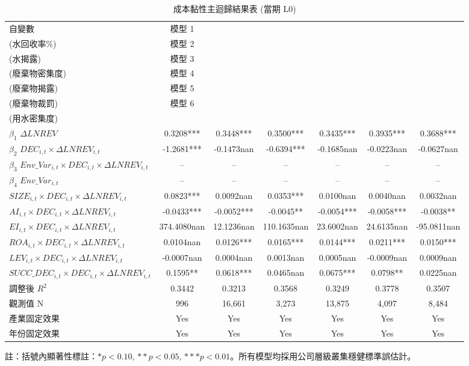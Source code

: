 \documentclass[12pt,a4paper]{article}
\begin{document}
\begin{table}[H]
\centering
\caption{成本黏性主迴歸結果表 (當期 L0)}
\label{tab:main_reg}
\begin{threeparttable}
\scriptsize
\begin{tabular}{lcccccc}
\toprule
自變數 & 模型 1\\(水回收率\%) & 模型 2\\(水揭露) & 模型 3\\(廢棄物密集度) & 模型 4\\(廢棄物揭露) & 模型 5\\(廢棄物裁罰) & 模型 6\\(用水密集度) \\
\midrule
$\beta_1$ $\Delta LNREV$ & 0.3208*** & 0.3448*** & 0.3500*** & 0.3435*** & 0.3935*** & 0.3688*** \\
$\beta_2$ $DEC_{i,t} \times \Delta LNREV_{i,t}$ & -1.2681*** & -0.1473nan & -0.6394*** & -0.1685nan & -0.0223nan & -0.0627nan \\
$\beta_3$ $Env\_Var_{i,t} \times DEC_{i,t} \times \Delta LNREV_{i,t}$ & -- & -- & -- & -- & -- & -- \\
$\beta_4$ $Env\_Var_{i,t}$ & -- & -- & -- & -- & -- & -- \\
 $SIZE_{i,t} \times DEC_{i,t} \times \Delta LNREV_{i,t}$ & 0.0823*** & 0.0092nan & 0.0353*** & 0.0100nan & 0.0040nan & 0.0032nan \\
 $AI_{i,t} \times DEC_{i,t} \times \Delta LNREV_{i,t}$ & -0.0433*** & -0.0052*** & -0.0045** & -0.0054*** & -0.0058*** & -0.0038** \\
 $EI_{i,t} \times DEC_{i,t} \times \Delta LNREV_{i,t}$ & 374.4080nan & 12.1236nan & 110.1635nan & 23.6002nan & 24.6135nan & -95.0811nan \\
 $ROA_{i,t} \times DEC_{i,t} \times \Delta LNREV_{i,t}$ & 0.0104nan & 0.0126*** & 0.0165*** & 0.0144*** & 0.0211*** & 0.0150*** \\
 $LEV_{i,t} \times DEC_{i,t} \times \Delta LNREV_{i,t}$ & -0.0007nan & 0.0004nan & 0.0013nan & 0.0005nan & -0.0009nan & 0.0009nan \\
 $SUCC\_DEC_{i,t} \times DEC_{i,t} \times \Delta LNREV_{i,t}$ & 0.1595** & 0.0618*** & 0.0465nan & 0.0675*** & 0.0798** & 0.0225nan \\
\midrule
調整後 $R^2$ & 0.3442 & 0.3213 & 0.3568 & 0.3249 & 0.3778 & 0.3507 \\
觀測值 N & 996 & 16,661 & 3,273 & 13,875 & 4,097 & 8,484 \\
產業固定效果 & Yes & Yes & Yes & Yes & Yes & Yes \\
年份固定效果 & Yes & Yes & Yes & Yes & Yes & Yes \\
\bottomrule
\end{tabular}
\begin{tablenotes}
\small
\item 註：括號內顯著性標註：$* p < 0.10$, $** p < 0.05$, $*** p < 0.01$。所有模型均採用公司層級叢集穩健標準誤估計。
\end{tablenotes}
\end{threeparttable}
\end{table}
\end{document}
